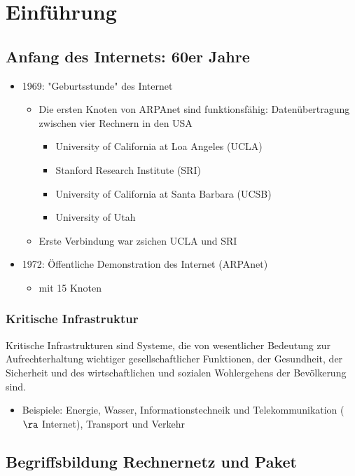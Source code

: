 \section{Einführung}
  \subsection{Anfang des Internets: 60er Jahre}
    \begin{itemize}
      \item 1969: "Geburtsstunde" des Internet
        \begin{itemize}
          \item Die ersten Knoten von ARPAnet sind funktionsfähig: Datenübertragung zwischen vier
            Rechnern in den USA
            \begin{itemize}
              \item University of California at Loa Angeles (UCLA)
              \item Stanford Research Institute (SRI)
              \item University of California at Santa Barbara (UCSB)
              \item University of Utah
            \end{itemize}
          \item Erste Verbindung war zsichen UCLA und SRI
        \end{itemize}
      \item 1972: Öffentliche Demonstration des Internet (ARPAnet) 
        \begin{itemize}
          \item mit 15 Knoten
        \end{itemize}
    \end{itemize}
    \subsubsection{Kritische Infrastruktur}
      Kritische Infrastrukturen sind Systeme, die von wesentlicher Bedeutung zur Aufrechterhaltung
      wichtiger gesellschaftlicher Funktionen, der Gesundheit, der Sicherheit und des wirtschaftlichen
      und sozialen Wohlergehens der Bevölkerung sind.
      \begin{itemize}
        \item Beispiele: Energie, Wasser, Informationstechneik und Telekommunikation ($\ra$ Internet),
          Transport und Verkehr
      \end{itemize}
  \subsection{Begriffsbildung Rechnernetz und Paket}
